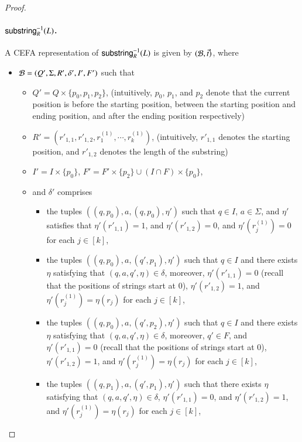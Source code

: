\begin{proof}
	\paragraph*{$\mathsf{substring}^{-1}_R(L)$.}
	A CEFA representation of $\mathsf{substring}^{-1}_R(L)$ is given by $(\mathcal{B}, \vec{t})$, where 
	\begin{itemize}
		\item $\mathcal{B} = (Q', \Sigma, R', \delta', I', F')$ such that 
		\begin{itemize}
			\item $Q' = Q \times \{p_0, p_1, p_2\}$, (intuitively, $p_0$, $p_1$, and $p_2$ denote that the current position is before the starting position, between the starting position and ending position, and after the ending position respectively)
			\item $R' = \left(r'_{1,1}, r'_{1,2}, r^{(1)}_1,\cdots, r^{(1)}_k \right)$, (intuitively, $r'_{1,1}$ denotes the starting position, and $r'_{1,2}$ denotes the length of the substring)
			\item $I'=I \times \{p_0\}$, $F'=F' \times \{p_2\} \cup (I \cap F) \times \{p_0\}$,
			\item and $\delta'$ comprises 
			\begin{itemize}
				\item the tuples $((q, p_0), a, (q, p_0), \eta')$ such that $q \in I$, $a \in \Sigma$, and $\eta'$ satisfies that $\eta'(r'_{1,1})= 1$, and $\eta'(r'_{1,2}) = 0$, and $\eta'(r^{(1)}_j)=0$ for each $j \in [k]$, 
				\item the tuples $((q, p_0), a, (q', p_1), \eta')$ such that $q \in I$ and there exists $\eta$ satisfying that $(q, a, q', \eta) \in \delta$, moreover, $\eta'(r'_{1,1})=0$ (recall that the positions of strings start at $0$), $\eta'(r'_{1,2}) = 1$, and $\eta'(r^{(1)}_j)=\eta(r_j)$ for each $j \in [k]$,
				\item the tuples $((q, p_0), a, (q', p_2), \eta')$ such that $q \in I$ and there exists $\eta$ satisfying that $(q, a, q', \eta) \in \delta$, moreover, $q' \in F$, and $\eta'(r'_{1,1})=0$ (recall that the positions of strings start at $0$), $\eta'(r'_{1,2}) = 1$, and $\eta'(r^{(1)}_j)=\eta(r_j)$ for each $j \in [k]$,  
				\item the tuples $((q, p_1), a, (q', p_1), \eta')$ such that there exists $\eta$ satisfying that $(q, a, q', \eta) \in \delta$, $\eta'(r'_{1,1}) = 0$, and $\eta'(r'_{1,2}) = 1$, and $\eta'(r^{(1)}_j)=\eta(r_j)$ for each $j \in [k]$,

\end{itemize}
\end{itemize}
\end{itemize}
\end{proof}
